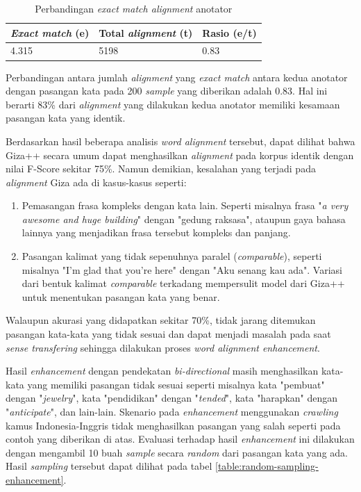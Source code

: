\begin{table}
	\centering
	\caption{Perbandingan \textit{exact match alignment} anotator}
	\label{table:exact-match-anotator}
	\begin{tabular}{|p{3cm}|p{3cm}|p{3cm}|}
		\hline
		\textbf{\textit{Exact match} (e)} & \textbf{Total \textit{alignment} (t)} & \textbf{Rasio (e/t)}
		\\ \hline
		4.315 & 5198 & 0.83 \\ \hline
	\end{tabular} 
\end{table}
 
Perbandingan antara jumlah \textit{alignment} yang \textit{exact match} antara kedua anotator dengan pasangan kata pada 200 \textit{sample} yang diberikan adalah 0.83. Hal ini berarti 83\% dari \textit{alignment} yang dilakukan kedua anotator memiliki kesamaan pasangan kata yang identik.

Berdasarkan hasil beberapa analisis \textit{word alignment} tersebut, dapat dilihat bahwa Giza++ secara umum dapat menghasilkan \textit{alignment} pada korpus identik dengan nilai F-Score sekitar 75\%. Namun demikian, kesalahan yang terjadi pada \textit{alignment} Giza ada di kasus-kasus seperti:

\begin{enumerate}
	\item Pemasangan frasa kompleks dengan kata lain. Seperti misalnya frasa "\textit{a very awesome and huge building}" dengan "gedung raksasa", ataupun gaya bahasa lainnya yang menjadikan frasa tersebut kompleks dan panjang.
	\item Pasangan kalimat yang tidak sepenuhnya paralel (\textit{comparable}), seperti misalnya "I'm glad that you're here" dengan "Aku senang kau ada". Variasi dari bentuk kalimat \textit{comparable} terkadang mempersulit model dari Giza++ untuk menentukan pasangan kata yang benar.
\end{enumerate}

Walaupun akurasi yang didapatkan sekitar 70\%, tidak jarang ditemukan pasangan kata-kata yang tidak sesuai dan dapat menjadi masalah pada saat \textit{sense transfering} sehingga dilakukan proses \textit{word alignment enhancement}.

Hasil \textit{enhancement} dengan pendekatan \textit{bi-directional} masih menghasilkan kata-kata yang memiliki pasangan tidak sesuai seperti misalnya kata "pembuat" dengan "\textit{jewelry}", kata "pendidikan" dengan "\textit{tended}", kata "harapkan" dengan "\textit{anticipate}", dan lain-lain. Skenario pada \textit{enhancement} menggunakan \textit{crawling} kamus Indonesia-Inggris tidak menghasilkan pasangan yang salah seperti pada contoh yang diberikan di atas. Evaluasi terhadap hasil \textit{enhancement} ini dilakukan dengan mengambil 10 buah \textit{sample} secara \textit{random} dari pasangan kata yang ada. Hasil \textit{sampling} tersebut dapat dilihat pada tabel \ref{table:random-sampling-enhancement}.

